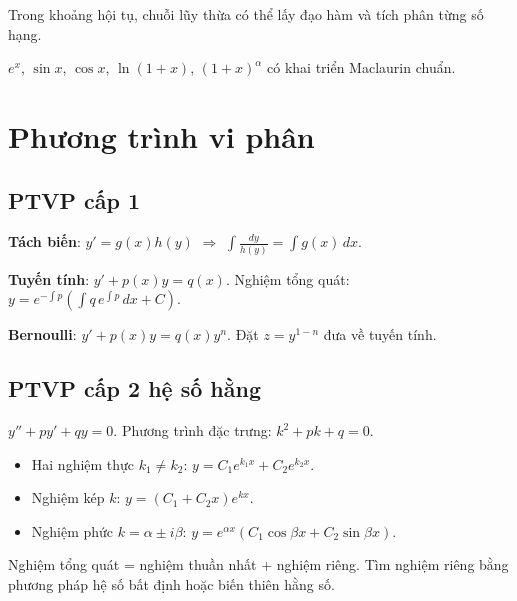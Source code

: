 \documentclass[12pt,a4paper]{article}
\begin{document}
\begin{tinhchat}
  Trong khoảng hội tụ, chuỗi lũy thừa có thể lấy đạo hàm và tích phân từng số hạng.
\end{tinhchat}

\begin{vidu}
  $e^x$, $\sin x$, $\cos x$, $\ln(1+x)$, $(1+x)^\alpha$ có khai triển Maclaurin chuẩn.
\end{vidu}

\section{Phương trình vi phân}

\subsection{PTVP cấp 1}

\begin{dinhnghia}
  \textbf{Tách biến}: $y' = g(x)h(y)$ $\Rightarrow$ $\displaystyle\int \frac{dy}{h(y)} = \int g(x)\,dx$.
\end{dinhnghia}

\begin{dinhnghia}
  \textbf{Tuyến tính}: $y' + p(x)y = q(x)$. Nghiệm tổng quát: $y = e^{-\int p}\left(\int q\,e^{\int p}\,dx + C\right)$.
\end{dinhnghia}

\begin{dinhnghia}
  \textbf{Bernoulli}: $y' + p(x)y = q(x)y^n$. Đặt $z = y^{1-n}$ đưa về tuyến tính.
\end{dinhnghia}

\subsection{PTVP cấp 2 hệ số hằng}

\begin{dinhnghia}
  $y'' + py' + qy = 0$. Phương trình đặc trưng: $k^2 + pk + q = 0$.
\end{dinhnghia}

\begin{congthuc}[title={Nghiệm}]
  \begin{itemize}
    \item Hai nghiệm thực $k_1 \ne k_2$: $y = C_1 e^{k_1 x} + C_2 e^{k_2 x}$.
    \item Nghiệm kép $k$: $y = (C_1 + C_2 x)e^{kx}$.
    \item Nghiệm phức $k = \alpha \pm i\beta$: $y = e^{\alpha x}(C_1 \cos\beta x + C_2 \sin\beta x)$.
  \end{itemize}
\end{congthuc}

\begin{phuongphap}[title={PTVP không thuần nhất $y'' + py' + qy = f(x)$}]
  Nghiệm tổng quát = nghiệm thuần nhất + nghiệm riêng. Tìm nghiệm riêng bằng phương pháp hệ số bất định hoặc biến thiên hằng số.
\end{phuongphap}
\end{document}
